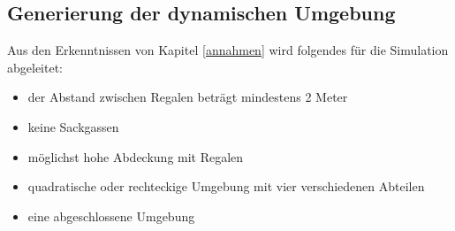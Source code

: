 \subsection{Generierung der dynamischen Umgebung}
Aus den Erkenntnissen von Kapitel \ref{annahmen} wird folgendes für die Simulation abgeleitet:
\\
\begin{itemize}
	\item der Abstand zwischen Regalen beträgt mindestens 2 Meter
	\item keine Sackgassen
	\item möglichst hohe Abdeckung mit Regalen
	\item quadratische oder rechteckige Umgebung mit vier verschiedenen Abteilen
	\item eine abgeschlossene Umgebung
\end{itemize}
\noindent
\\

